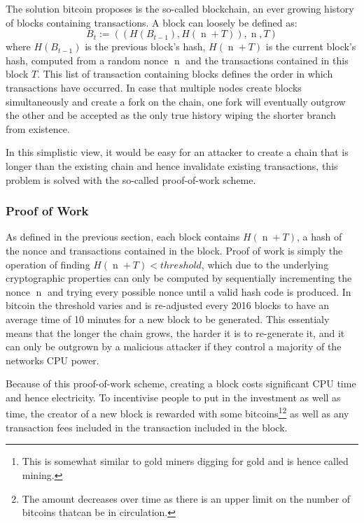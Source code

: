 \documentclass[12pt,msc,a4paper,oneside]{ucl_thesis}
\DeclareMathOperator{\nonce}{n}
\begin{document}
The solution bitcoin proposes is the so-called blockchain, an ever growing history of blocks containing transactions. A block can loosely be defined as:
\begin{equation}
    B_t := ((H(B_{t-1}), H(\nonce + T)), \nonce, T)
\end{equation}
where $H(B_{t-1})$ is the previous block's hash, $H(\nonce + T)$ is the current block's hash, computed from a random nonce $\nonce$ and the transactions contained in this block $T$. This list of transaction containing blocks defines the order in which transactions have occurred. In case that multiple nodes create blocks simultaneously and create a fork on the chain, one fork will eventually outgrow the other and be accepted as the only true history wiping the shorter branch from existence.

In this simplistic view, it would be easy for an attacker to create a chain that is longer than the existing chain and hence invalidate existing transactions, this problem is solved with the so-called proof-of-work scheme.

\subsubsection{Proof of Work} \label{sec:background_bitcoin:proof_of_work}
As defined in the previous section, each block contains $H(\nonce + T)$, a hash of the nonce and transactions contained in the block. Proof of work is simply the operation of finding $H(\nonce + T) < threshold$, which due to the underlying cryptographic properties can only be computed by sequentially incrementing the nonce $\nonce$ and trying every possible nonce until a valid hash code is produced. In bitcoin the threshold varies and is re-adjusted every 2016 blocks to have an average time of 10 minutes for a new block to be generated. This essentialy means that the longer the chain grows, the harder it is to re-generate it, and it can only be outgrown by a malicious attacker if they control a majority of the networks CPU power.

Because of this proof-of-work scheme, creating a block costs significant CPU time and hence electricity. To incentivise people to put in the investment as well as time, the creator of a new block is rewarded with some bitcoins\footnote{This is somewhat similar to gold miners digging for gold and is hence called mining.}\footnote{The amount decreases over time as there is an upper limit on the number of bitcoins thatcan be in circulation.} as well as any transaction fees included in the transaction included in the block. \cite{bitcoin:satoshi}
\end{document}

